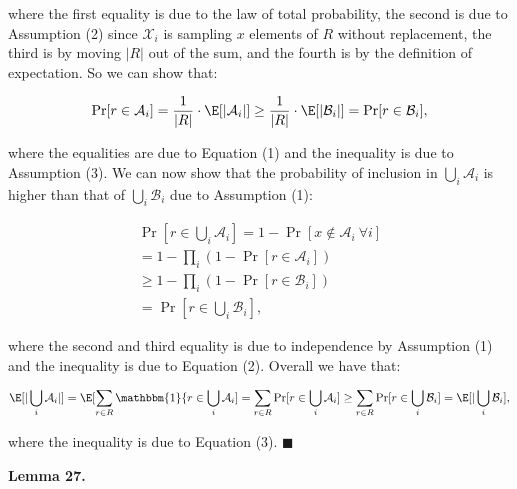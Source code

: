 where the first equality is due to the law of total probability, the second is due to Assumption (2) since $\mathcal{X}_{i}$ is sampling $x$ elements of $R$ without replacement, the third is by moving $|R|$ out of the sum, and the fourth is by the definition of expectation.
So we can show that:\par


\[\begin{gathered}
\displaystyle\Pr[r\in\mathcal{A}_{i}]=\frac{1}{|R|}\cdot\E[|\mathcal{A}_{i}|]\geq\frac{1}{|R|}\cdot\E[|\mathcal{B}_{i}|]=\Pr[r\in\mathcal{B}_{i}],
\end{gathered}\]


where the equalities are due to Equation (1) and the inequality is due to Assumption (3).
We can now show that the probability of inclusion in $\bigcup_{i}{\mathcal{A}_{i}}$ is higher than that of $\bigcup_{i}{\mathcal{B}_{i}}$ due to Assumption (1):\par


\[\begin{gathered}
\displaystyle\Pr[r\in\bigcup_{i}{\mathcal{A}_{i}}] \displaystyle=1-\Pr[x\notin\mathcal{A}_{i}\ \forall i] \\
\displaystyle=1-\prod_{i}{\left(1-\Pr[r\in\mathcal{A}_{i}]\right)} \\
\displaystyle\geq 1-\prod_{i}{\left(1-\Pr[r\in\mathcal{B}_{i}]\right)} \\
\displaystyle=\Pr[r\in\bigcup_{i}{\mathcal{B}_{i}}],
\end{gathered}\]


where the second and third equality is due to independence by Assumption (1) and the inequality is due to Equation (2).
Overall we have that:\par


\[\begin{gathered}
\displaystyle\E[|\bigcup_{i}{\mathcal{A}_{i}}|]=\E[\sum_{r\in R}{\mathbbm{1}\{r\in\bigcup_{i}{\mathcal{A}_{i}}}]=\sum_{r\in R}{\Pr[r\in\bigcup_{i}{\mathcal{A}_{i}}]}\geq\sum_{r\in R}{\Pr[r\in\bigcup_{i}{\mathcal{B}_{i}}]}=\E[|\bigcup_{i}{\mathcal{B}_{i}}],
\end{gathered}\]


where the inequality is due to Equation (3).
\ensuremath{\blacksquare}\par






\par\medskip\noindent\textbf{\textbf{Lemma 27}\textbf{.}}\par



